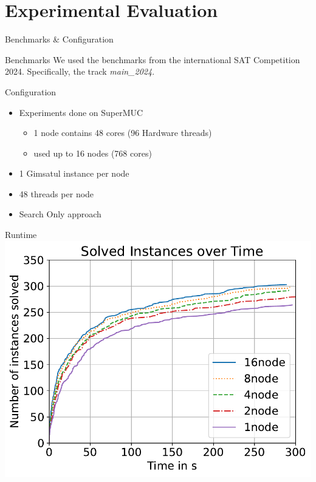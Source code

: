\documentclass[]{sdqbeamer}
\begin{document}
\section{Experimental Evaluation}
\begin{frame}{Benchmarks \& Configuration}
    \begin{block}{Benchmarks}
        We used the benchmarks from the international SAT Competition 2024. Specifically, the track \textit{main\_2024}.
    \end{block}

    \begin{block}{Configuration}
        \begin{itemize}
            \item Experiments done on SuperMUC
            \begin{itemize}
                \item 1 node contains 48 cores (96 Hardware threads)
                \item used up to 16 nodes (768 cores)
            \end{itemize}
            \item 1 Gimsatul instance per node
            \item 48 threads per node
            \item Search Only approach
        \end{itemize}
    \end{block}
\end{frame}

\begin{frame}{Runtime}
    \center
    \includegraphics[scale=1]{plots/cumulative_runtime/scalability_gim.pdf}
\end{frame}
\end{document}
